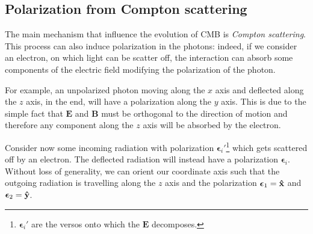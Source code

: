 \subsection{Polarization from Compton scattering}\label{sec:ComptonPolarization}

The main mechanism that influence the evolution of CMB is \emph{Compton scattering}. This process can also induce polarization in the photons: indeed, if we consider an electron, on which light can be scatter off, the interaction can absorb some components of the electric field modifying the polarization of the photon.

For example, an unpolarized photon moving along the $x$ axis and deflected along the $z$ axis, in the end, will have a polarization along the $y$ axis. This is due to the simple fact that $\mathbf{E}$ and $\mathbf{B}$ must be orthogonal to the direction of motion and therefore any component along the $z$ axis will be absorbed by the electron.

Consider now some incoming radiation with polarization $\boldsymbol{\epsilon}_i'$\footnote{$\boldsymbol{\epsilon}_i'$ are the versos onto which the $\mathbf{E}$ decomposes.} which gets scattered off by an electron. The deflected radiation will instead have a polarization $\boldsymbol{\epsilon}_i$. Without loss of generality, we can orient our coordinate axis such that the outgoing radiation is travelling along the $z$ axis and the polarization $\boldsymbol{\epsilon}_1=\mathbf{\hat{x}}$ and $\boldsymbol{\epsilon}_2=\mathbf{\hat{y}}$. 

